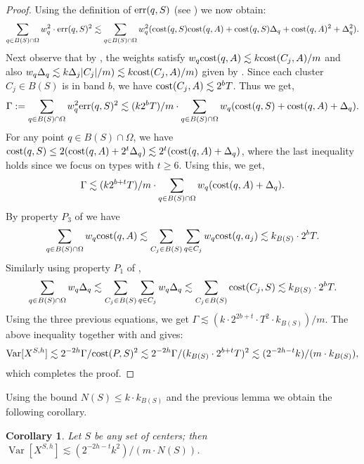 \documentclass[11pt]{article}
\newtheorem{corollary}[lemma]{Corollary}
\theoremstyle{restate}
\theoremstyle{definition}
\DeclareMathOperator*{\var}{\mathrm{Var}}
\newcommand{\cost}{\textnormal{cost}}
\newcommand{\err}{\textnormal{err}}
\begin{document}
\begin{proof}
Using the definition of $\err(q,S)$ (see ) we now obtain:
\begin{equation*}
    \sum_{q \in B(S) \cap \Omega }  w_q^2 \cdot \err(q,S)^2 \lesssim  \sum_{q \in B(S)\cap \Omega}  w_q^2  (\cost(q,S) \cost(q,A) + \cost(q,S) \Delta_q  + \cost(q,A)^2 + \Delta_q^2).
\end{equation*}
Next observe that by , the weights satisfy $w_q \cost(q,A) \lesssim k \cost(C_j, A)/m$ and also $w_q \Delta_q \lesssim k \Delta_j |C_j|/m) \lesssim k \cost(C_j, A)/m)$ given by . Since each cluster  $C_j \in B(S)$ is in band $b$, we have $\cost(C_j, A) \lesssim 2^b T$. Thus we get,
\begin{align*}
    \Gamma := \sum_{q \in B(S) \cap \Omega} w_q^2 \err(q,S)^2 \lesssim (k 2^b T)/m \cdot  \sum_{q \in B(S) \cap \Omega} w_q (\cost(q,S) + \cost(q,A) + \Delta_q). 
\end{align*}
 For any point $q \in B(S) \cap \Omega$, we have $\cost(q,S) \leq 2(\cost(q,A) + 2^t \Delta_q) \lesssim 2^t( \cost(q,A) + \Delta_q)$, where the last inequality holds since we focus on types with $t\geq 6$. Using this, we get,
 \begin{align*}
     \Gamma \lesssim (k 2^{b+t} T)/m \cdot  \sum_{q \in B(S) \cap \Omega} w_q ( \cost(q,A) + \Delta_q).
 \end{align*}
 By property $P_3$ of  we have 
 \begin{align*}
     \sum_{q \in B(S) \cap \Omega} w_q \cost(q,A) \lesssim \sum_{C_j \in B(S)} \sum_{q \in C_j} w_q \cost(q,a_j) \lesssim k_{B(S)} \cdot 2^{b}T.
\end{align*}
Similarly using property $P_1$ of , 
\begin{align*}
  \sum_{q \in B(S) \cap \Omega} w_q \Delta_q \lesssim \sum_{C_j \in B(S)} \sum_{q \in C_j} w_q \Delta_q  \lesssim  \sum_{C_j \in B(S)} \cost(C_j, S) \lesssim k_{B(S)} \cdot 2^{b}T.  
\end{align*}
Using the three previous equations, 
we get $\Gamma \lesssim (k\cdot 2^{2b +t} \cdot  T^2 \cdot k_{B(S)})/m $. The above inequality together with  and  gives:
\begin{align*}
    \var[X^{S,h}] \lesssim 2^{-2h}\Gamma/ \cost(P,S)^2     \lesssim 2^{-2h}\Gamma/ (k_{B(S)}\cdot 2^{b+t}T)^2 \lesssim (2^{-2h-t} k)/(m\cdot k_{B(S)}),
\end{align*}
which completes the proof.
\end{proof}
\noindent Using the bound $ N(S) \leq k \cdot k_{B(S)}$ and the previous lemma we obtain the following corollary.
\begin{corollary}\label{cor: worst-case-var} 
Let $S$ be any set of centers; then  $\var[X^{S,h}] \lesssim (2^{-2h-t}k^2)/(m \cdot N(S))$.
\end{corollary}
\end{document}
